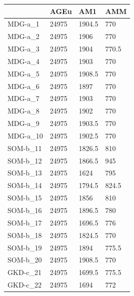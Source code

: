 \documentclass[11pt,a4paper]{article}
\begin{document}
	\begin{table}[H]
		\centering
		\begin{tabular}{l|l|l|l|}
			\cline{2-4}
			& AGEu  & AM1    & AMM   \\ \hline
			\multicolumn{1}{|l|}{MDG-a\_1}  & 24975 & 1904.5 & 770   \\ \hline
			\multicolumn{1}{|l|}{MDG-a\_2}  & 24975 & 1906   & 770   \\ \hline
			\multicolumn{1}{|l|}{MDG-a\_3}  & 24975 & 1904   & 770.5 \\ \hline
			\multicolumn{1}{|l|}{MDG-a\_4}  & 24975 & 1903   & 770   \\ \hline
			\multicolumn{1}{|l|}{MDG-a\_5}  & 24975 & 1908.5 & 770   \\ \hline
			\multicolumn{1}{|l|}{MDG-a\_6}  & 24975 & 1897   & 770   \\ \hline
			\multicolumn{1}{|l|}{MDG-a\_7}  & 24975 & 1903   & 770   \\ \hline
			\multicolumn{1}{|l|}{MDG-a\_8}  & 24975 & 1902   & 770   \\ \hline
			\multicolumn{1}{|l|}{MDG-a\_9}  & 24975 & 1903.5 & 770   \\ \hline
			\multicolumn{1}{|l|}{MDG-a\_10} & 24975 & 1902.5 & 770   \\ \hline
			\multicolumn{1}{|l|}{SOM-b\_11} & 24975 & 1826.5 & 810   \\ \hline
			\multicolumn{1}{|l|}{SOM-b\_12} & 24975 & 1866.5 & 945   \\ \hline
			\multicolumn{1}{|l|}{SOM-b\_13} & 24975 & 1624   & 795   \\ \hline
			\multicolumn{1}{|l|}{SOM-b\_14} & 24975 & 1794.5 & 824.5 \\ \hline
			\multicolumn{1}{|l|}{SOM-b\_15} & 24975 & 1856   & 810   \\ \hline
			\multicolumn{1}{|l|}{SOM-b\_16} & 24975 & 1896.5 & 780   \\ \hline
			\multicolumn{1}{|l|}{SOM-b\_17} & 24975 & 1696.5 & 776   \\ \hline
			\multicolumn{1}{|l|}{SOM-b\_18} & 24975 & 1824.5 & 770   \\ \hline
			\multicolumn{1}{|l|}{SOM-b\_19} & 24975 & 1894   & 775.5 \\ \hline
			\multicolumn{1}{|l|}{SOM-b\_20} & 24975 & 1908.5 & 770   \\ \hline
			\multicolumn{1}{|l|}{GKD-c\_21} & 24975 & 1699.5 & 775.5 \\ \hline
			\multicolumn{1}{|l|}{GKD-c\_22} & 24975 & 1694   & 772   \\ \hline

\end{tabular}
\end{table}
\end{document}
